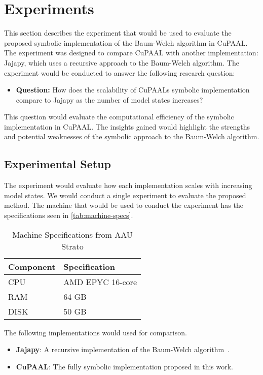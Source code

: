 \section{Experiments}\label{sec:experiments}
This section describes the experiment that would be used to evaluate the proposed symbolic implementation of the Baum-Welch algorithm in CuPAAL.
The experiment was designed to compare CuPAAL with another implementation: Jajapy, which uses a recursive approach to the Baum-Welch algorithm.
The experiment would be conducted to answer the following research question:

\begin{itemize}
\item \textbf{Question:} How does the scalability of CuPAALs symbolic implementation compare to Jajapy as the number of model states increases?
\end{itemize}

This question would evaluate the computational efficiency of the symbolic implementation in CuPAAL.
The insights gained would highlight the strengths and potential weaknesses of the symbolic approach to the Baum-Welch algorithm.

\subsection{Experimental Setup}
The experiment would evaluate how each implementation scales with increasing model states. 
We would conduct a single experiment to evaluate the proposed method.
The machine that would be used to conduct the experiment has the specifications seen in \autoref{tab:machine-specs}. 
\begin{table}[htb!]
\centering
\caption{Machine Specifications from AAU Strato}
\label{tab:machine-specs}
    \begin{tabular}{ll}
        \toprule
        \textbf{Component} & \textbf{Specification} \\
        \midrule
        CPU & AMD EPYC 16-core \\
        RAM & 64 GB \\
        DISK & 50 GB \\
        \bottomrule
    \end{tabular}
\end{table}

The following implementations would used for comparison.

\begin{itemize}
\item \textbf{Jajapy}: A recursive implementation of the Baum-Welch algorithm~\cite{reynouard2023jajapy}.
\item \textbf{CuPAAL}: The fully symbolic implementation proposed in this work.
\end{itemize}

